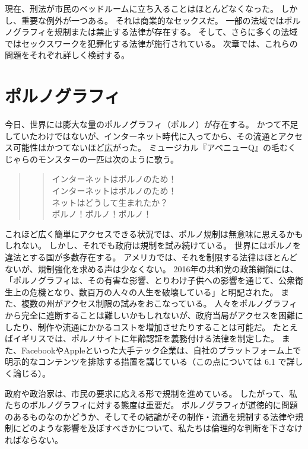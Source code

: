 \documentclass[paper=a4,book,openany]{jlreq} \usepackage{mystyle}
\begin{document}
現在、刑法が市民のベッドルームに立ち入ることはほとんどなくなった。
しかし、重要な例外が一つある。
それは商業的なセックスだ。
一部の法域ではポルノグラフィを規制または禁止する法律が存在する。
そして、さらに多くの法域ではセックスワークを犯罪化する法律が施行されている。
次章では、これらの問題をそれぞれ詳しく検討する。

\section{ポルノグラフィ}

今日、世界には膨大な量のポルノグラフィ（ポルノ）が存在する。
かつて不足していたわけではないが、インターネット時代に入ってから、その流通とアクセス可能性はかつてないほど広がった。
ミュージカル『アベニューQ』の毛むくじゃらのモンスターの一匹は次のように歌う\citep{dabruzzo03:_inter_is_porn}。

\begin{quote}

  \begin{verse}
    インターネットはポルノのため！\\インターネットはポルノのため！\\ネットはどうして生まれたか？\\ポルノ！ポルノ！ポルノ！
  \end{verse}
\end{quote}

これほど広く簡単にアクセスできる状況では、ポルノ規制は無意味に思えるかもしれない。
しかし、それでも政府は規制を試み続けている。
世界にはポルノを違法とする国が多数存在する。
アメリカでは、それを制限する法律はほとんどないが、規制強化を求める声は少なくない。
2016年の共和党の政策綱領には、「ポルノグラフィは、その有害な影響、とりわけ子供への影響を通じて、公衆衛生上の危機となり、数百万の人々の人生を破壊している」と明記された\citep{obrien16:_south_carol_lawmak_propos_pornog}。
また、複数の州がアクセス制限の試みをおこなっている\citep{brown17:_hypoc_logic_behin_repub_plans}。
人々をポルノグラフィから完全に遮断することは難しいかもしれないが、政府当局がアクセスを困難にしたり、制作や流通にかかるコストを増加させたりすることは可能だ。
たとえばイギリスでは、ポルノサイトに年齢認証を義務付ける法律を制定した。
また、FacebookやAppleといった大手テック企業は、自社のプラットフォーム上で明示的なコンテンツを排除する措置を講じている（この点については 6.1 で詳しく論じる）。

政府や政治家は、市民の要求に応える形で規制を進めている。
したがって、私たちのポルノグラフィに対する態度は重要だ。
ポルノグラフィが道徳的に問題のあるものなのかどうか、そしてその結論がその制作・流通を規制する法律や規制にどのような影響を及ぼすべきかについて、私たちは倫理的な判断を下さなければならない。
\end{document}
